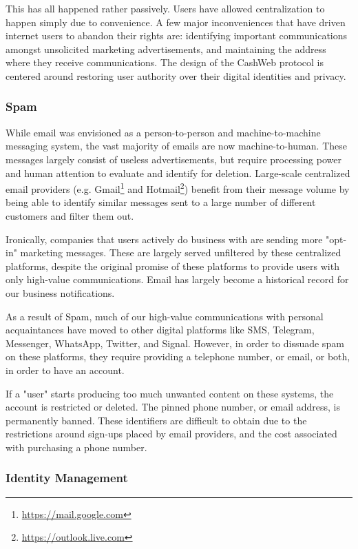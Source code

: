 \documentclass{article}
\begin{document}
This has all happened rather passively. Users have allowed centralization to happen simply due to convenience. A few major inconveniences that have driven internet users to abandon their rights are: identifying important communications amongst unsolicited marketing advertisements, and maintaining the address where they receive communications. The design of the CashWeb protocol is centered around restoring user authority over their digital identities and privacy.

\subsubsection{Spam}

While email was envisioned as a person-to-person and machine-to-machine messaging system, the vast majority of emails are now machine-to-human. These messages largely consist of useless advertisements, but require processing power and human attention to evaluate and identify for deletion. Large-scale centralized email providers (e.g. Gmail\footnote{\url{https://mail.google.com}} and Hotmail\footnote{\url{https://outlook.live.com}}) benefit from their message volume by being able to identify similar messages sent to a large number of different customers and filter them out.

Ironically, companies that users actively do business with are sending more "opt-in" marketing messages. These are largely served unfiltered by these centralized platforms, despite the original promise of these platforms to provide users with only high-value communications. Email has largely become a historical record for our business notifications.

As a result of Spam, much of our high-value communications with personal acquaintances have moved to other digital platforms like SMS, Telegram, Messenger, WhatsApp, Twitter, and Signal. However, in order to dissuade spam on these platforms, they require providing a telephone number, or email, or both, in order to have an account.

If a "user" starts producing too much unwanted content on these systems, the account is restricted or deleted. The pinned phone number, or email address, is permanently banned. These identifiers are difficult to obtain due to the restrictions around sign-ups placed by email providers, and the cost associated with purchasing a phone number.

\subsubsection{Identity Management}
\end{document}

